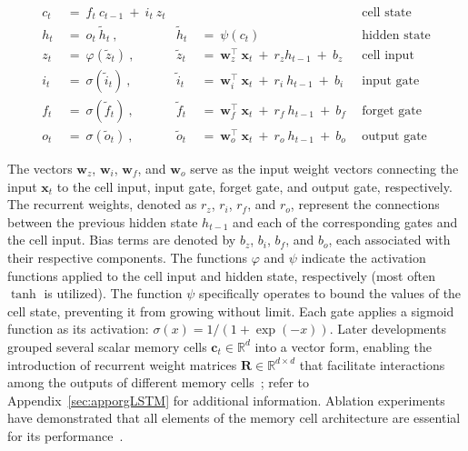 \begin{align}
c_t \ &= \  f_t \ c_{t-1} \ + \ i_t \ z_t &  & &\text{cell state} \\
h_t  \ &= \ o_t \ \tilde{h}_t \ , & \tilde{h}_t \ &= \ \psi \left( c_t\right)
  &\text{hidden state} \\
z_t \ &= \ \varphi \left( \tilde{z}_t \right) \ , 
  &\tilde{z}_t \ &=  \ \mathbf{w}^\top_{z} \ \mathbf{x}_t \ + \
  r_{z}  h_{t-1} \ + \  b_{z} \ \
  &\text{cell input} \\
i_t \ &= \ \sigma \left( \tilde{i}_t  \right) \ , 
  &\tilde{i}_t \ &= \ \mathbf{w}^\top_{i} \ \mathbf{x}_t \ + \
  r_{i}  \ h_{t-1} \ + \  b_{i} \ \
  &\text{input gate} \\
f_t \ &= \ \sigma \left(  \tilde{f}_t \right) \ , 
  &\tilde{f}_t \ &= \ \mathbf{w}^\top_{f} \ \mathbf{x}_t  \ + \
  r_{f}  \ h_{t-1} \ + \  b_{f} \ \
  &\text{forget gate} \\
o_t \ &= \ \sigma \left( \tilde{o}_t \right) \ , 
  &\tilde{o}_t  \ &= \ \mathbf{w}^\top_{o} \ \mathbf{x}_t \ + \
  r_{o}  \ h_{t-1} \ + \  b_{o} \ \
  &\text{output gate} 
\end{align}

The vectors $\mathbf{w}_{z}$, $\mathbf{w}_{i}$, $\mathbf{w}_{f}$, and $\mathbf{w}_{o}$ serve as the input weight vectors connecting the input $\mathbf{x}_t$ to the cell input, input gate, forget gate, and output gate, respectively. The recurrent weights, denoted as $r_{z}$, $r_{i}$, $r_{f}$, and $r_{o}$, represent the connections between the previous hidden state $h_{t-1}$ and each of the corresponding gates and the cell input. Bias terms are denoted by $b_{z}$, $b_{i}$, $b_{f}$, and $b_{o}$, each associated with their respective components. The functions $\varphi$ and $\psi$ indicate the activation functions applied to the cell input and hidden state, respectively (most often $\tanh$ is utilized). The function $\psi$ specifically operates to bound the values of the cell state, preventing it from growing without limit. Each gate applies a sigmoid function as its activation: $\sigma \left( x \right) = 1/(1+\exp(-x))$. Later developments grouped several scalar memory cells $\mathbf{c}_t \in \mathbb{R}^{d}$ into a vector form, enabling the introduction of recurrent weight matrices $\mathbf{R} \in \mathbb{R}^{d \times d}$ that facilitate interactions among the outputs of different memory cells~\citep{Greff:15}; refer to Appendix~\ref{sec:apporgLSTM} for additional information. Ablation experiments have demonstrated that all elements of the memory cell architecture are essential for its performance~\citep{Greff:15}.


